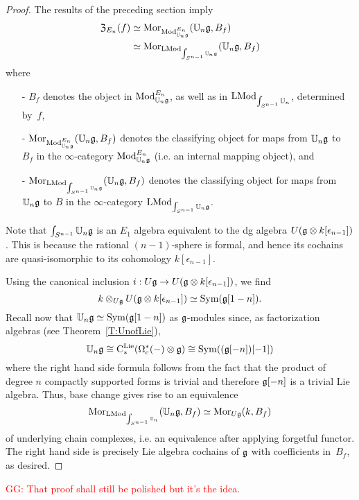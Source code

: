 \documentclass[11pt]{amsart}
\numberwithin{equation}{section}
\def\greg{\textcolor{red}{GG: }\textcolor{red}}
\begin{document}
\begin{proof}
The results of the preceding section imply
\begin{align*}
{\frak Z}_{E_n}(f) &\simeq {{\rm Mor}}_{{\rm Mod}^{E_n}_{\mathbb U_n\mathfrak g}}(\mathbb U_n \mathfrak g, B_f) \\
&\simeq {\rm Mor}_{{\rm LMod}_{\int_{S^{n-1}} \mathbb U_n\mathfrak g}}(\mathbb U_n \mathfrak g, B_f)
\end{align*}
where 
\begin{itemize}
\item[-] $B_f$ denotes the object in ${\rm Mod}^{E_n}_{\mathbb U_n\mathfrak g}$, as well as in ${\rm LMod}_{\int_{S^{n-1}}\mathbb U_n}$, determined by~$f$, 
\item[-] ${\rm Mor}_{{\rm Mod}^{E_n}_{\mathbb U_n\mathfrak g}}(\mathbb U_n \mathfrak g, B_f)$ denotes the classifying object for maps from $\mathbb U_n\mathfrak g$ to $B_f$ in the $\infty$-category ${\rm Mod}^{E_n}_{\mathbb U_n\mathfrak g}$ (i.e. an internal mapping object), and
\item[-] ${\rm Mor}_{{\rm LMod}_{\int_{S^{n-1}} \mathbb U_n\mathfrak g}} (\mathbb U_n \mathfrak g, B_f)$ denotes the classifying object for maps from ${\mathbb U_n\mathfrak g}$ to $B$ in the $\infty$-category ${\rm LMod}_{\int_{S^{n-1}}\mathbb U_n\mathfrak g}$. 
\end{itemize}
Note that $\int_{S^{n-1}}\mathbb U_n\mathfrak g$ is an $E_1$ algebra equivalent to the dg algebra $U(\mathfrak g \otimes k[\epsilon_{n-1}])$.
This is because the rational $(n-1)$-sphere is formal, and hence its cochains are quasi-isomorphic to its cohomology $k[\epsilon_{n-1}]$. 
 
\smallskip


Using the canonical inclusion $i: U\mathfrak g \to U(\mathfrak g \otimes k[\epsilon_{n-1}])$,
we find
\[
k \otimes_{U\mathfrak g} U(\mathfrak g \otimes k[\epsilon_{n-1}]) \simeq {\rm Sym}(\mathfrak g[1-n]).
\]
Recall now that $\mathbb U_n \mathfrak g \simeq {\rm Sym}(\mathfrak g[1-n])$ as $\mathfrak g$-modules 
since, as factorization algebras (see Theorem~\ref{T:UnofLie}),  $$\mathbb U_n \mathfrak g \cong {\rm C}^{\rm Lie}_*(\Omega^*_c(-) \otimes \mathfrak g) \cong {\rm Sym}((\mathfrak g[-n])[-1])$$ where the right hand side formula follows from the fact that the product of degree $n$ compactly supported forms is trivial and therefore $\mathfrak g[-n]$ is a trivial Lie algebra.   
Thus, base change  gives rise to an equivalence 
\[
{\rm Mor}_{{\rm LMod}_{\int_{S^{n-1}} \mathbb U_n}} (\mathbb U_n \mathfrak g, B_f)  \simeq {\rm Mor}_{U\mathfrak g} (k, B_f)
\]
of underlying chain complexes, i.e. an equivalence after applying forgetful functor. The right hand side is precisely Lie algebra cochains of $\mathfrak g$ with coefficients in~$B_f$, as desired.
\end{proof}
\greg{That proof shall still be polished but it's the idea.}
\end{document}
